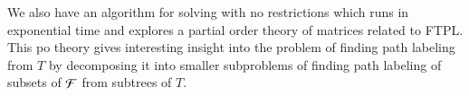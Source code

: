 \documentclass[MS,synopsis]{iitmdiss}
\begin{document}
We also have an algorithm for solving {\CFTPL} with no restrictions
which runs in exponential time and explores a partial order theory of
matrices related to {FTPL}. This po theory gives interesting insight
into the problem of finding path labeling from $T$ by decomposing it
into smaller subproblems of finding path labeling of subsets
of ${\cal F}$ from subtrees of $T$.




\end{document}
